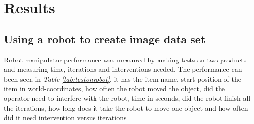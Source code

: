 \chapter{Results}

\section{Using a robot to create image data set}\label{resrobotcontrol}
Robot manipulator performance was measured by making tests on two products and measuring time, iterations and interventions needed. The performance can been seen in \textit{Table \ref{tab:testonrobot}}, it has the item name, start position of the item in world-coordinates, how often the robot moved the object, did the operator need to interfere with the robot, time in seconds, did the robot finish all the iterations, how long does it take the robot to move one object and how often did it need intervention versus iterations. 
\vspace{1cm}
